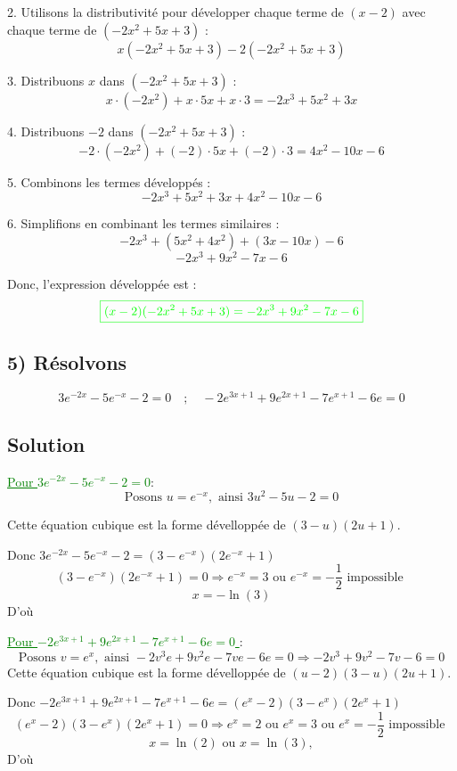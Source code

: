 \documentclass[12pt]{article}
\begin{document}
2. Utilisons la distributivité pour développer chaque terme de \((x-2)\) avec chaque terme de \((-2x^2 + 5x + 3)\) :
\[
x(-2x^2 + 5x + 3) - 2(-2x^2 + 5x + 3)
\]

3. Distribuons \(x\) dans \((-2x^2 + 5x + 3)\) :
\[
x \cdot (-2x^2) + x \cdot 5x + x \cdot 3 = -2x^3 + 5x^2 + 3x
\]

4. Distribuons \(-2\) dans \((-2x^2 + 5x + 3)\) :
\[
-2 \cdot (-2x^2) + (-2) \cdot 5x + (-2) \cdot 3 = 4x^2 - 10x - 6
\]

5. Combinons les termes développés :
\[
-2x^3 + 5x^2 + 3x + 4x^2 - 10x - 6
\]

6. Simplifions en combinant les termes similaires :
\[
-2x^3 + (5x^2 + 4x^2) + (3x - 10x) - 6
\]
\[
-2x^3 + 9x^2 - 7x - 6
\]

Donc, l'expression développée est :
\[\textcolor{green}{\boxed{
(x-2)(-2x^2 + 5x + 3) = -2x^3 + 9x^2 - 7x - 6
}}\]

\subsection*{5) Résolvons } 
\[
3e^{-2x}-5e^{-x}-2=0 \quad ; \quad -2e^{3x+1}+9e^{2x+1}-7e^{x+1}-6e=0
\]

\subsection*{Solution}
\textcolor{green}{\underline{Pour \(3e^{-2x}-5e^{-x}-2=0\)}}:
\[
\text{Posons } u = e^{-x}, \text{ ainsi } 3u^2 - 5u - 2 = 0
\]

Cette équation cubique est la forme dévelloppée de $(3-u)(2u+1)$.

Donc $3e^{-2x}-5e^{-x}-2=(3-e^{-x})(2e^{-x}+1)$
\[
(3-e^{-x})(2e^{-x}+1)= 0 \Longrightarrow e^{-x}=3 \text{ ou } e^{-x}=-\frac{1}{2} \text{ impossible }
\]
\[
x=-\ln(3)
\]
D'où \textcolor{green}{}

\textcolor{green}{\underline{Pour \(-2e^{3x+1}+9e^{2x+1}-7e^{x+1}-6e=0\) }}:
\[
\text{Posons } v = e^{x}, \text{ ainsi } -2v^3e + 9v^2e - 7ve - 6e = 0 \Longrightarrow -2v^3 + 9v^2 - 7v - 6 = 0
\]
Cette équation cubique est la forme dévelloppée de $(u-2)(3-u)(2u+1)$.

Donc $-2e^{3x+1}+9e^{2x+1}-7e^{x+1}-6e=(e^{x}-2)(3-e^{x})(2e^{x}+1)$
\[
(e^{x}-2)(3-e^{x})(2e^{x}+1)= 0 \Longrightarrow e^{x}=2 \text{ ou } e^{x}=3 \text{ ou } e^{x}=-\frac{1}{2} \text{ impossible }
\]
\[
x=\ln(2) \text{ ou }x=\ln(3), 
\]
D'où \textcolor{green}{}
\end{document}
